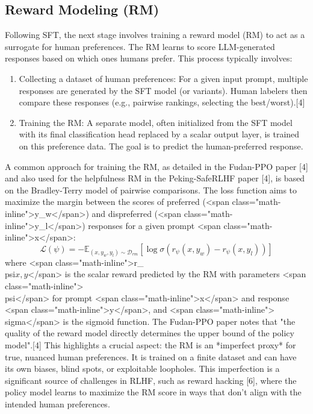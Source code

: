 \documentclass[10pt,journal,compsoc]{IEEEtran} %
\begin{document}
\subsection{Reward Modeling (RM)}
Following SFT, the next stage involves training a reward model (RM) to act as a surrogate for human preferences. The RM learns to score LLM-generated responses based on which ones humans prefer. This process typically involves:
\begin{enumerate}
    \item Collecting a dataset of human preferences: For a given input prompt, multiple responses are generated by the SFT model (or variants). Human labelers then compare these responses (e.g., pairwise rankings, selecting the best/worst).[4]
    \item Training the RM: A separate model, often initialized from the SFT model with its final classification head replaced by a scalar output layer, is trained on this preference data. The goal is to predict the human-preferred response.
\end{enumerate}
A common approach for training the RM, as detailed in the Fudan-PPO paper [4] and also used for the helpfulness RM in the Peking-SafeRLHF paper [4], is based on the Bradley-Terry model of pairwise comparisons. The loss function aims to maximize the margin between the scores of preferred (<span class="math-inline">y\_w</span>) and dispreferred (<span class="math-inline">y\_l</span>) responses for a given prompt <span class="math-inline">x</span>:
$$ \mathcal{L}(\psi) = -\mathbb{E}_{(x,y_w,y_l)\sim\mathcal{D}_{rm}}[\log \sigma(r_\psi(x,y_w) - r_\psi(x,y_l))] $$
where <span class="math-inline">r\_\\psi\(x,y\)</span> is the scalar reward predicted by the RM with parameters <span class="math-inline">\\psi</span> for prompt <span class="math-inline">x</span> and response <span class="math-inline">y</span>, and <span class="math-inline">\\sigma</span> is the sigmoid function. The Fudan-PPO paper notes that "the quality of the reward model directly determines the upper bound of the policy model".[4] This highlights a crucial aspect: the RM is an *imperfect proxy* for true, nuanced human preferences. It is trained on a finite dataset and can have its own biases, blind spots, or exploitable loopholes. This imperfection is a significant source of challenges in RLHF, such as reward hacking [6], where the policy model learns to maximize the RM score in ways that don't align with the intended human preferences.
\end{document}
